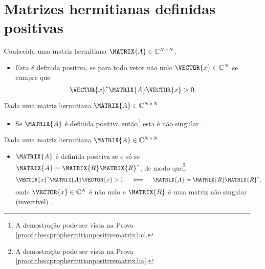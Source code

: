 \section{ Matrizes hermitianas definidas positivas}


\begin{definition}\label{def:hermitianapositivematrix0}
Conhecida uma matriz hermitiana $\MATRIX{A} \in \mathbb{C}^{N \times N}$. 
\begin{itemize}
\item Esta é definida positiva, se para todo vetor não nulo $\VECTOR{x} \in \mathbb{C}^N$
se cumpre que \cite[pp. 63]{ipsen2009numerical} 
\begin{equation}
\VECTOR{x}^{\ast} \MATRIX{A} \VECTOR{x} > 0.
\end{equation}
\end{itemize}
\end{definition}


\begin{theorem}\label{theo:prophermitianpositivematrix2}
Dada uma matriz hermitiana $\MATRIX{A} \in \mathbb{C}^{N \times N}$.
\begin{itemize}
\item Se $\MATRIX{A}$ é definida positiva então\footnote{A
demostração pode ser vista na Prova \ref{proof:theo:prophermitianpositivematrix1:c}.}  
esta é não singular \cite[pp. 63]{ipsen2009numerical}.
\end{itemize}
\end{theorem}
\begin{theorem}\label{theo:prophermitianpositivematrix0}
Dada uma matriz hermitiana $\MATRIX{A} \in \mathbb{C}^{N \times N}$.
\begin{itemize}
\item $\MATRIX{A}$ é definida positiva se e só se $\MATRIX{A}=\MATRIX{R}\MATRIX{R}^{\ast}$,
de modo que\footnote{A
demostração pode ser vista na Prova \ref{proof:theo:prophermitianpositivematrix1:a}.}  
\begin{equation}
\VECTOR{x}^{\ast} \MATRIX{A} \VECTOR{x} > 0 \quad \iff \quad \MATRIX{A}=\MATRIX{R}\MATRIX{R}^{\ast},
\end{equation}
onde $\VECTOR{x} \in \mathbb{C}^{N}$ é não nulo e
$\MATRIX{R}$ é uma matriz não singular (invertível) \cite[pp. 309]{hartfiel2000matrix}. %
\end{itemize}
\end{theorem}




